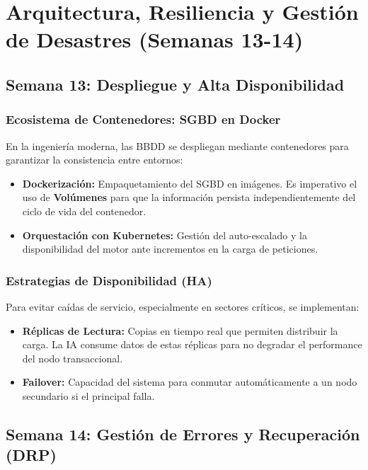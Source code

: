\documentclass[12pt,a4paper,openany,oneside]{book}
\begin{document}
\chapter{Arquitectura, Resiliencia y Gestión de Desastres (Semanas 13-14)}

\section{Semana 13: Despliegue y Alta Disponibilidad}

\subsection{Ecosistema de Contenedores: SGBD en Docker}
En la ingeniería moderna, las BBDD se despliegan mediante contenedores para garantizar la consistencia entre entornos:
\begin{itemize}
    \item \textbf{Dockerización:} Empaquetamiento del SGBD en imágenes. Es imperativo el uso de \textbf{Volúmenes} para que la información persista independientemente del ciclo de vida del contenedor.
    \item \textbf{Orquestación con Kubernetes:} Gestión del auto-escalado y la disponibilidad del motor ante incrementos en la carga de peticiones.
\end{itemize}

\subsection{Estrategias de Disponibilidad (HA)}
Para evitar caídas de servicio, especialmente en sectores críticos, se implementan:
\begin{itemize}
    \item \textbf{Réplicas de Lectura:} Copias en tiempo real que permiten distribuir la carga. La IA consume datos de estas réplicas para no degradar el performance del nodo transaccional.
    \item \textbf{Failover:} Capacidad del sistema para conmutar automáticamente a un nodo secundario si el principal falla.
\end{itemize}



\section{Semana 14: Gestión de Errores y Recuperación (DRP)}
\end{document}

